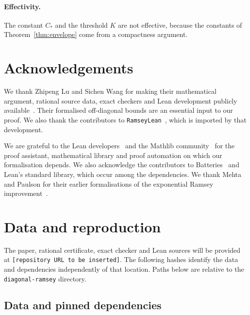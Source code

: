 \documentclass[11pt]{article}
\theoremstyle{definition}
\theoremstyle{remark}
\newcommand{\repository}{\texttt{[repository URL to be inserted]}}
\begin{document}
\paragraph{Effectivity.} The constant $C_*$ and the threshold $K$ are not effective, because the constants of
Theorem~\ref{thm:envelope} come from a compactness argument.

\section*{Acknowledgements}

We thank Zhipeng Lu and Sichen Wang for making their mathematical argument, rational source data, exact checkers
and Lean development publicly available~\cite{LW,LWcode}. Their formalised off-diagonal bounds are an essential
input to our proof. We also thank the contributors to \texttt{RamseyLean}~\cite{RamseyLean}, which is imported
by that development.

We are grateful to the Lean developers~\cite{Lean4} and the Mathlib community~\cite{Mathlib} for the proof
assistant, mathematical library and proof automation on which our formalisation depends.
We also acknowledge the contributors to Batteries~\cite{Batteries} and Lean's standard library, which occur among the
dependencies. We thank Mehta and Paulson for their earlier formalisations of the exponential Ramsey
improvement~\cite{Mehta,Paulson}.

\appendix
\section{Data and reproduction}\label{app:data}

The paper, rational certificate, exact checker and Lean sources will be provided at \repository.
The following hashes identify the data and dependencies independently of that location.
Paths below are relative to the \texttt{diagonal-ramsey} directory.

\subsection{Data and pinned dependencies}
\end{document}

